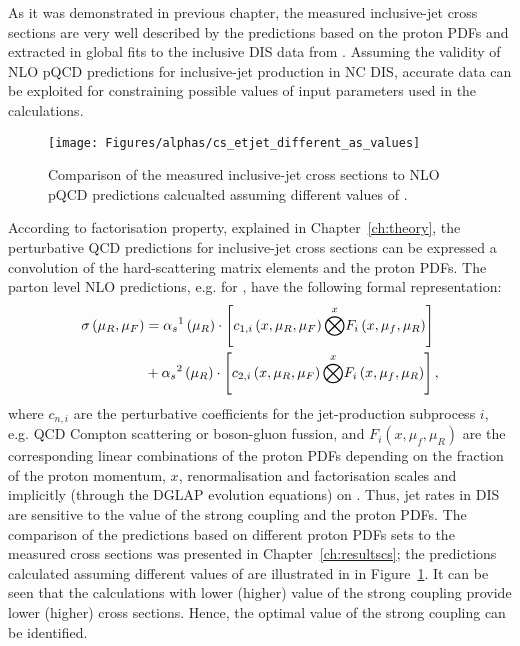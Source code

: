 As it was demonstrated in previous chapter, the measured inclusive-jet cross sections are very well described by the predictions based on the proton PDFs and \asz extracted in global fits to the inclusive DIS data from \hera. Assuming the validity of NLO pQCD predictions for inclusive-jet production in NC DIS, accurate data can be exploited for constraining possible values of input parameters used in the calculations.
\begin{figure}[t]
 \centering
 \texttt{[image: Figures/alphas/cs\_etjet\_different\_as\_values]}
 \caption{Comparison of the measured inclusive-jet cross sections to NLO pQCD predictions calcualted assuming different values of \asz.}
 \label{fig:etjetdifferentas}
\end{figure}

According to factorisation property, explained in Chapter~\ref{ch:theory}, the perturbative QCD predictions for inclusive-jet cross sections can be expressed a convolution of the hard-scattering matrix elements and the proton PDFs. The parton level NLO predictions, e.g. for \dsdetjetb, have the following formal representation:
\begin{equation}
	\begin{split}
\sigma\left( \mu_R, \mu_F\right)  &= \mbox{$\alpha_{s}$}^1\left( \mu_R\right) \cdot \left[ c_{1,i}\left( x, \mu_R, \mu_F\right) \overset{x}{\bigotimes } F_i\left( x, \mu_f, \mu_R \right) \right] \\
&+ \mbox{$\alpha_{s}$}^2\left( \mu_R\right) \cdot \left[ c_{2,i}\left( x, \mu_R, \mu_F\right) \overset{x}{\bigotimes } F_i\left( x, \mu_f, \mu_R \right) \right],
	\end{split}
\end{equation}
where $c_{n,i}$ are the perturbative coefficients for the jet-production subprocess $i$, e.g. QCD Compton scattering or boson-gluon fussion, and $F_i\left( x, \mu_f, \mu_R \right)$ are the corresponding linear combinations of the proton PDFs depending on the fraction of the proton momentum, $x$, renormalisation and factorisation scales and implicitly (through the DGLAP evolution equations) on \as. Thus, jet rates in DIS are sensitive to the value of the strong coupling and the proton PDFs. The comparison of the predictions based on different proton PDFs sets to the measured cross sections was presented in Chapter~\ref{ch:resultscs}; the predictions calculated assuming different values of \asz are illustrated in in Figure~\ref{fig:etjetdifferentas}. It can be seen that the calculations with lower (higher) value of the strong coupling provide lower (higher) cross sections. Hence, the optimal value of the strong coupling can be identified.

